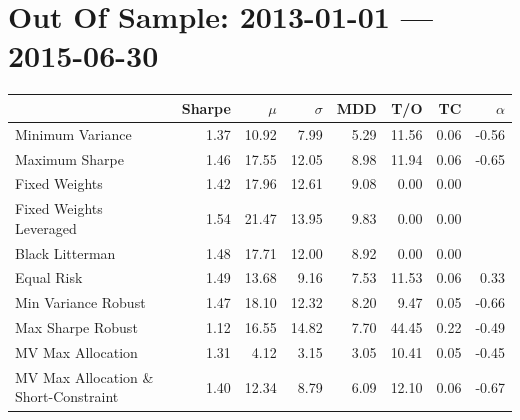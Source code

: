 \documentclass[11pt, parskip=full, DIV=14]{scrreprt}
\begin{document}
\chapter{Out Of Sample: 2013-01-01 --- 2015-06-30}
\begin{table}[ht]
\centering
\begin{tabular}{lrrrrrrr}
\toprule
                      & Sharpe & $\mu$ &$\sigma$& MDD & T/O & TC & $\alpha$ \\ 
\midrule
Minimum Variance & 1.37 & 10.92 & 7.99 & 5.29 & 11.56 & 0.06 & -0.56 \\ 
  Maximum Sharpe & 1.46 & 17.55 & 12.05 & 8.98 & 11.94 & 0.06 & -0.65 \\ 
  Fixed Weights & 1.42 & 17.96 & 12.61 & 9.08 & 0.00 & 0.00 &  \\ 
  Fixed Weights Leveraged & 1.54 & 21.47 & 13.95 & 9.83 & 0.00 & 0.00 &  \\ 
  Black Litterman & 1.48 & 17.71 & 12.00 & 8.92 & 0.00 & 0.00 &  \\ 
  Equal Risk & 1.49 & 13.68 & 9.16 & 7.53 & 11.53 & 0.06 & 0.33 \\ 
  Min Variance Robust & 1.47 & 18.10 & 12.32 & 8.20 & 9.47 & 0.05 & -0.66 \\ 
  Max Sharpe Robust & 1.12 & 16.55 & 14.82 & 7.70 & 44.45 & 0.22 & -0.49 \\ 
  MV Max Allocation & 1.31 & 4.12 & 3.15 & 3.05 & 10.41 & 0.05 & -0.45 \\ 
  MV Max Allocation \& Short-Constraint & 1.40 & 12.34 & 8.79 & 6.09 & 12.10 & 0.06 & -0.67 \\ 
\bottomrule
\end{tabular}
\end{table}

\end{document}
